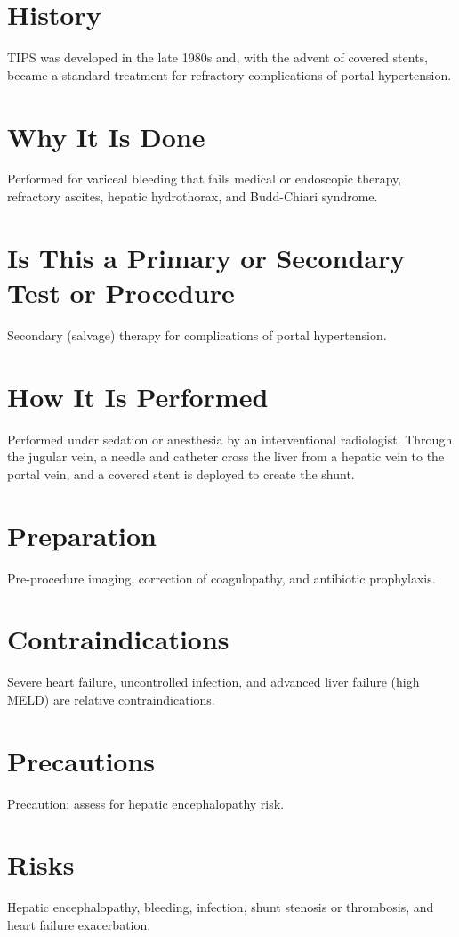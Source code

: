\section*{History}
TIPS was developed in the late 1980s and, with the advent of covered stents, became a standard treatment for refractory complications of portal hypertension.

\section*{Why It Is Done}
Performed for variceal bleeding that fails medical or endoscopic therapy, refractory ascites, hepatic hydrothorax, and Budd-Chiari syndrome.

\section*{Is This a Primary or Secondary Test or Procedure}
Secondary (salvage) therapy for complications of portal hypertension.

\section*{How It Is Performed}
Performed under sedation or anesthesia by an interventional radiologist. Through the jugular vein, a needle and catheter cross the liver from a hepatic vein to the portal vein, and a covered stent is deployed to create the shunt.

\section*{Preparation}
Pre-procedure imaging, correction of coagulopathy, and antibiotic prophylaxis.

\section*{Contraindications}
Severe heart failure, uncontrolled infection, and advanced liver failure (high MELD) are relative contraindications.

\section*{Precautions}
Precaution: assess for hepatic encephalopathy risk.

\section*{Risks}
Hepatic encephalopathy, bleeding, infection, shunt stenosis or thrombosis, and heart failure exacerbation.

